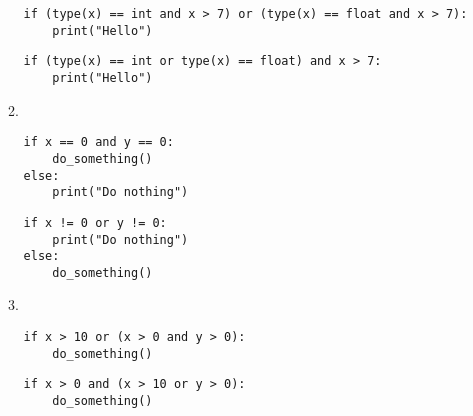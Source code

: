 \documentclass{../../../fal_assignment}
\begin{document}
\begin{enumerate}
\begin{enumerate}
\begin{lstlisting}
if (type(x) == int and x > 7) or (type(x) == float and x > 7):
    print("Hello")
                \end{lstlisting}
                \begin{lstlisting}
if (type(x) == int or type(x) == float) and x > 7:
    print("Hello")
                \end{lstlisting}
            \item {\ }
                \begin{lstlisting}
if x == 0 and y == 0:
    do_something()
else:
    print("Do nothing")
                \end{lstlisting}
                \begin{lstlisting}
if x != 0 or y != 0:
    print("Do nothing")
else:
    do_something()
                \end{lstlisting}
            \item {\ }
                \begin{lstlisting}
if x > 10 or (x > 0 and y > 0):
    do_something()
                \end{lstlisting}
                \begin{lstlisting}
if x > 0 and (x > 10 or y > 0):
    do_something()
                \end{lstlisting}
        \end{enumerate}
\end{enumerate}
\end{document}
